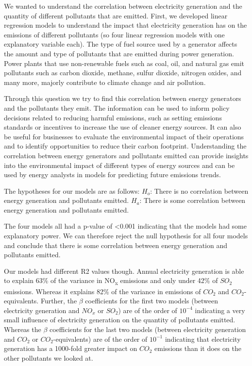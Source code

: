\documentclass[
]{article}
\begin{document}
We wanted to understand the correlation between electricity generation
and the quantity of different pollutants that are emitted. First, we
developed linear regression models to understand the impact that
electricity generation has on the emissions of different pollutants (so
four linear regression models with one explanatory variable each). The
type of fuel source used by a generator affects the amount and type of
pollutants that are emitted during power generation. Power plants that
use non-renewable fuels such as coal, oil, and natural gas emit
pollutants such as carbon dioxide, methane, sulfur dioxide, nitrogen
oxides, and many more, majorly contribute to climate change and air
pollution.

Through this question we try to find this correlation between energy
generators and the pollutants they emit. The information can be used to
inform policy decisions related to reducing harmful emissions, such as
setting emissions standards or incentives to increase the use of cleaner
energy sources. It can also be useful for businesses to evaluate the
environmental impact of their operations and to identify opportunities
to reduce their carbon footprint. Understanding the correlation between
energy generators and pollutants emitted can provide insights into the
environmental impact of different types of energy sources and can be
used by energy analysts in models for predicting future emissions
trends.

The hypotheses for our models are as follows: \(H_o\): There is no
correlation between energy generation and pollutants emitted. \(H_a\):
There is some correlation between energy generation and pollutants
emitted.

The four models all had a p-value of \textless0.001 indicating that the
models had some explanatory power. We can therefore reject the null
hypothesis for all four models and conclude that there is some
correlation between energy generation and pollutants emitted.

Our models had different R2 values though. Annual electricity generation
is able to explain 63\% of the variance in NO\textsubscript{x} emissions
and only under 42\% of \(SO_2\) emissions. Whereas it explains 82\% of
the variance in emissions of \(CO_2\) and \(CO_2\)-equivalents. Further,
the \(\beta\) coefficients for the first two models (between electricity
generation and \(NO_x\) or \(SO_2\)) are of the order of \(10^{-4}\)
indicating a very small influence of electricity generation on the
quantity of pollutants emitted. Whereas the \(\beta\) coefficients for
the last two models (between electricity generation and \(CO_2\) or
\(CO_2\)-equivalents) are of the order of \(10^{-1}\) indicating that
electricity generation has a 1000-fold greater impact on \(CO_2\)
emissions than it does on the other pollutants we looked at.
\end{document}
